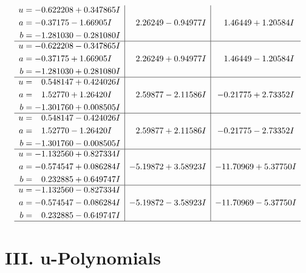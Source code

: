 \documentclass[1p]{elsarticle_modified}
\theoremstyle{definition}
\begin{document}
$$\begin{array}{c|c|c}
\begin{aligned}
u &= -0.622208 + 0.347865 I \\
a &= -0.37175 - 1.66905 I \\
b &= -1.281030 - 0.281080 I\end{aligned}
 & \phantom{-}2.26249 - 0.94977 I & \phantom{-}1.46449 + 1.20584 I \\ \hline\begin{aligned}
u &= -0.622208 - 0.347865 I \\
a &= -0.37175 + 1.66905 I \\
b &= -1.281030 + 0.281080 I\end{aligned}
 & \phantom{-}2.26249 + 0.94977 I & \phantom{-}1.46449 - 1.20584 I \\ \hline\begin{aligned}
u &= \phantom{-}0.548147 + 0.424026 I \\
a &= \phantom{-}1.52770 + 1.26420 I \\
b &= -1.301760 + 0.008505 I\end{aligned}
 & \phantom{-}2.59877 - 2.11586 I & -0.21775 + 2.73352 I \\ \hline\begin{aligned}
u &= \phantom{-}0.548147 - 0.424026 I \\
a &= \phantom{-}1.52770 - 1.26420 I \\
b &= -1.301760 - 0.008505 I\end{aligned}
 & \phantom{-}2.59877 + 2.11586 I & -0.21775 - 2.73352 I \\ \hline\begin{aligned}
u &= -1.132560 + 0.827334 I \\
a &= -0.574547 + 0.086284 I \\
b &= \phantom{-}0.232885 + 0.649747 I\end{aligned}
 & -5.19872 + 3.58923 I & -11.70969 + 5.37750 I \\ \hline\begin{aligned}
u &= -1.132560 - 0.827334 I \\
a &= -0.574547 - 0.086284 I \\
b &= \phantom{-}0.232885 - 0.649747 I\end{aligned}
 & -5.19872 - 3.58923 I & -11.70969 - 5.37750 I\\
 \hline 
 \end{array}$$\newpage
\newpage\renewcommand{\arraystretch}{1}
\centering \section*{ III. u-Polynomials}
\end{document}
